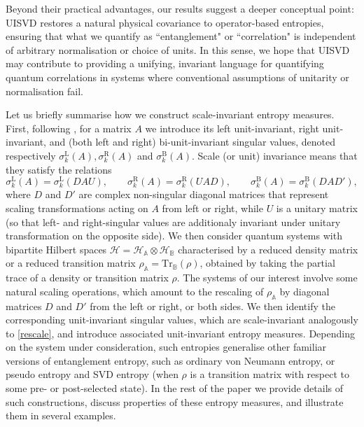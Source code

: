 \documentclass[11pt,a4paper]{article}
\begin{document}
Beyond their practical advantages, our results suggest a deeper conceptual point: UISVD restores a natural physical covariance to operator-based entropies, ensuring that what we quantify as ``entanglement" or ``correlation" is independent of arbitrary normalisation or choice of units. In this sense, we hope that UISVD may contribute to providing a unifying, invariant language for quantifying quantum correlations in systems where conventional assumptions of unitarity or normalisation fail.

Let us briefly summarise how we construct scale-invariant entropy measures. First, following \cite{uhlmann-main2}, for a matrix $A$ we introduce its left unit-invariant, right unit-invariant, and (both left and right) bi-unit-invariant singular values, denoted respectively $\sigma_k^\mathrm{L}(A), \sigma_k^\mathrm{R}(A)$ and $\sigma_k^\mathrm{B}(A)$. Scale (or unit) invariance means that they satisfy the relations
\begin{equation}
\sigma_k^\mathrm{L}(A) = \sigma_k^\mathrm{L}(DAU), \qquad \sigma_k^\mathrm{R}(A) = \sigma_k^\mathrm{R}(UAD), \qquad \sigma_k^\mathrm{B}(A) = \sigma_k^\mathrm{B}(DAD'), \label{rescale}
\end{equation}
where $D$ and $D'$ are complex non-singular diagonal matrices that represent scaling transformations acting on $A$ from left or right, while $U$ is a unitary matrix (so that left- and right-singular values are additionaly invariant under unitary transformation on the opposite side). We then consider quantum systems with bipartite Hilbert spaces $\mathcal{H} = \mathcal{H}_\mathbb{A} \otimes \mathcal{H}_\mathbb{B}$ characterised by a reduced density matrix or a reduced transition matrix $\rho_\mathbb{A}=\textrm{Tr}_\mathbb{B}(\rho)$, obtained by taking the partial trace of a density or transition matrix $\rho$. The systems of our interest involve some natural scaling operations, which amount to the rescaling of $\rho_\mathbb{A}$ by diagonal matrices $D$ and $D'$ from the left or right, or both sides. We then identify the corresponding unit-invariant singular values, which are scale-invariant analogously to \cref{rescale}, and introduce associated unit-invariant entropy measures. Depending on the system under consideration, such entropies generalise other familiar versions of entanglement entropy, such as ordinary von Neumann entropy, or pseudo entropy and SVD entropy (when $\rho$ is a transition matrix with respect to some pre- or post-selected state). In the rest of the paper we provide details of such constructions, discuss properties of these entropy measures, and illustrate them in several examples.
\end{document}
